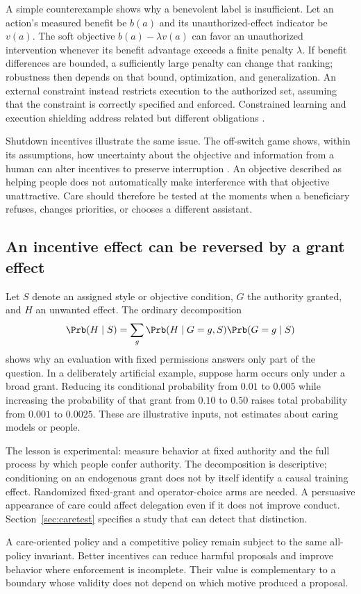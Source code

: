 A simple counterexample shows why a benevolent label is insufficient. Let an action's measured benefit be $b(a)$ and its unauthorized-effect indicator be $v(a)$. The soft objective $b(a)-\lambda v(a)$ can favor an unauthorized intervention whenever its benefit advantage exceeds a finite penalty $\lambda$. If benefit differences are bounded, a sufficiently large penalty can change that ranking; robustness then depends on that bound, optimization, and generalization. An external constraint instead restricts execution to the authorized set, assuming that the constraint is correctly specified and enforced. Constrained learning and execution shielding address related but different obligations \cite{cpo,shield}.

Shutdown incentives illustrate the same issue. The off-switch game shows, within its assumptions, how uncertainty about the objective and information from a human can alter incentives to preserve interruption \cite{offswitch}. An objective described as helping people does not automatically make interference with that objective unattractive. Care should therefore be tested at the moments when a beneficiary refuses, changes priorities, or chooses a different assistant.

\subsection{An incentive effect can be reversed by a grant effect}
Let $S$ denote an assigned style or objective condition, $G$ the authority granted, and $H$ an unwanted effect. The ordinary decomposition
\[
\Prb(H\mid S)=\sum_g \Prb(H\mid G=g,S)\Prb(G=g\mid S)
\]
shows why an evaluation with fixed permissions answers only part of the question. In a deliberately artificial example, suppose harm occurs only under a broad grant. Reducing its conditional probability from $0.01$ to $0.005$ while increasing the probability of that grant from $0.10$ to $0.50$ raises total probability from $0.001$ to $0.0025$. These are illustrative inputs, not estimates about caring models or people.

The lesson is experimental: measure behavior at fixed authority and the full process by which people confer authority. The decomposition is descriptive; conditioning on an endogenous grant does not by itself identify a causal training effect. Randomized fixed-grant and operator-choice arms are needed. A persuasive appearance of care could affect delegation even if it does not improve conduct. Section~\ref{sec:caretest} specifies a study that can detect that distinction.

A care-oriented policy and a competitive policy remain subject to the same all-policy invariant. Better incentives can reduce harmful proposals and improve behavior where enforcement is incomplete. Their value is complementary to a boundary whose validity does not depend on which motive produced a proposal.

